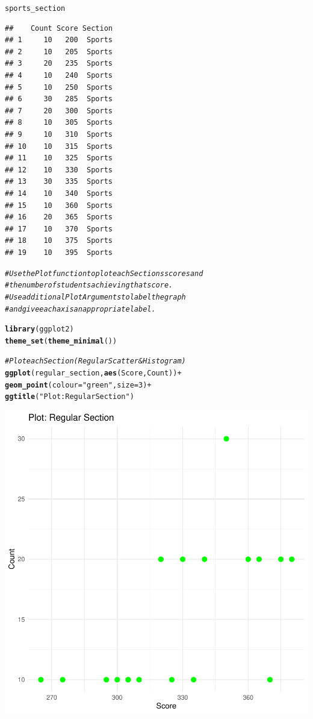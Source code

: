 \documentclass{article}\usepackage[]{graphicx}\usepackage[]{xcolor}
\makeatletter
\newcommand{\hlnum}[1]{\textcolor[rgb]{0.686,0.059,0.569}{#1}}%
\newcommand{\hlstr}[1]{\textcolor[rgb]{0.192,0.494,0.8}{#1}}%
\newcommand{\hlcom}[1]{\textcolor[rgb]{0.678,0.584,0.686}{\textit{#1}}}%
\newcommand{\hlopt}[1]{\textcolor[rgb]{0,0,0}{#1}}%
\newcommand{\hlstd}[1]{\textcolor[rgb]{0.345,0.345,0.345}{#1}}%
\newcommand{\hlkwc}[1]{\textcolor[rgb]{0.333,0.667,0.333}{#1}}%
\newcommand{\hlkwd}[1]{\textcolor[rgb]{0.737,0.353,0.396}{\textbf{#1}}}%
\newenvironment{kframe}{%
 \def\at@end@of@kframe{}%
 \ifinner\ifhmode%
  \def\at@end@of@kframe{\end{minipage}}%
  \begin{minipage}{\columnwidth}%
 \fi\fi%
 \def\FrameCommand##1{\hskip\@totalleftmargin \hskip-\fboxsep
 \colorbox{shadecolor}{##1}\hskip-\fboxsep
     \hskip-\linewidth \hskip-\@totalleftmargin \hskip\columnwidth}%
 \MakeFramed {\advance\hsize-\width
   \@totalleftmargin\z@ \linewidth\hsize
   \@setminipage}}%
 {\par\unskip\endMakeFramed%
 \at@end@of@kframe}
\newenvironment{knitrout}{}{} %
\makeatother
\begin{document}
\begin{knitrout}
\begin{kframe}
\begin{verbatim}
\end{verbatim}
\begin{alltt}
\hlstd{sports_section}
\end{alltt}
\begin{verbatim}
##    Count Score Section
## 1     10   200  Sports
## 2     10   205  Sports
## 3     20   235  Sports
## 4     10   240  Sports
## 5     10   250  Sports
## 6     30   285  Sports
## 7     20   300  Sports
## 8     10   305  Sports
## 9     10   310  Sports
## 10    10   315  Sports
## 11    10   325  Sports
## 12    10   330  Sports
## 13    30   335  Sports
## 14    10   340  Sports
## 15    10   360  Sports
## 16    20   365  Sports
## 17    10   370  Sports
## 18    10   375  Sports
## 19    10   395  Sports
\end{verbatim}
\begin{alltt}
\hlcom{# Use the Plot function to plot each Sections scores and }
\hlcom{# the number of students achieving that score. }
\hlcom{# Use additional Plot Arguments to label the graph }
\hlcom{# and give each axis an appropriate label. }


\hlkwd{library}\hlstd{(ggplot2)}
\hlkwd{theme_set}\hlstd{(}\hlkwd{theme_minimal}\hlstd{())}

\hlcom{# Plot each Section (Regular Scatter & Histogram)}
\hlkwd{ggplot}\hlstd{(regular_section,} \hlkwd{aes}\hlstd{(Score, Count))} \hlopt{+}
  \hlkwd{geom_point}\hlstd{(}\hlkwc{colour} \hlstd{=} \hlstr{"green"}\hlstd{,}\hlkwc{size} \hlstd{=} \hlnum{3}\hlstd{)} \hlopt{+}
  \hlkwd{ggtitle}\hlstd{(}\hlstr{"Plot: Regular Section"}\hlstd{)}
\end{alltt}
\end{kframe}

{\centering \includegraphics[width=.6\linewidth]{figure/week4-assignment-01-Couto-Maria-Rnwauto-report-1} 

}
\end{knitrout}
\end{document}
